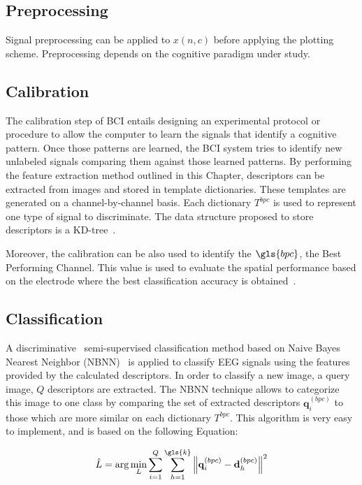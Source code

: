 \subsection{Preprocessing}

Signal preprocessing can be applied to $x(n,c)$ before applying the plotting scheme.  Preprocessing depends on the cognitive paradigm under study.  

\subsection{Calibration}
\label{Calibration}

The calibration step of BCI entails designing an experimental protocol or procedure to allow the computer to learn the signals that identify a cognitive pattern.  Once those patterns are learned, the BCI system tries to identify new unlabeled signals comparing them against those learned patterns.  By performing the feature extraction method outlined in this Chapter, descriptors can be extracted from images and stored in template dictionaries.  These templates are generated on a channel-by-channel basis.  Each dictionary $T^{bpc}$ is used to represent one type of signal to discriminate. The data structure proposed to store descriptors is a KD-tree~\cite{Lowe2004}.

Moreover, the calibration can be also used to identify the $\gls{bpc}$, the Best Performing Channel. This value is used to evaluate the spatial performance based on the electrode where the best classification accuracy is obtained~\cite{Chavarriaga2017}.

\subsection{Classification}
\label{nbnn}

A discriminative~\cite{WolpawJonathanR2012} semi-supervised classification method based on Naive Bayes Nearest Neighbor (NBNN)~\cite{Boiman2008} is applied to classify EEG signals using the features provided by the calculated descriptors. In order to classify a new image, a query image, $Q$ descriptors are extracted.  The NBNN technique allows to categorize this image to one class by comparing the set of extracted descriptors $\mathbf{q}_{i}^{(bpc)}$ to those which are more similar on each dictionary $T^{bpc}$.  This algorithm is very easy to implement, and is based on the following Equation:

\begin{equation}
\hat{L} = \arg \min_{L} \sum_{i=1}^{Q} \sum_{h=1}^{\gls{k}} {\left\lVert \mathbf{q}_{i}^{(bpc)} -  \mathbf{d}_{h}^{(bpc)} \right\rVert}  ^{2} 
\label{eq:classification}
\end{equation}

